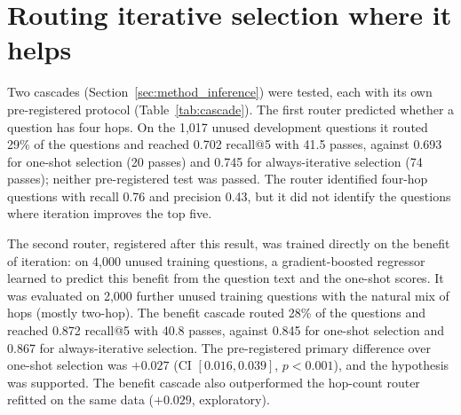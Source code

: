 \section{Routing iterative selection where it helps}
\label{sec:res_cascade}

Two cascades (Section~\ref{sec:method_inference}) were tested, each with its own pre-registered protocol (Table~\ref{tab:cascade}). The first router predicted whether a question has four hops. On the 1,017 unused development questions it routed 29\% of the questions and reached 0.702 recall@5 with 41.5 passes, against 0.693 for one-shot selection (20 passes) and 0.745 for always-iterative selection (74 passes); neither pre-registered test was passed. The router identified four-hop questions with recall 0.76 and precision 0.43, but it did not identify the questions where iteration improves the top five.

The second router, registered after this result, was trained directly on the benefit of iteration: on 4,000 unused training questions, a gradient-boosted regressor learned to predict this benefit from the question text and the one-shot scores. It was evaluated on 2,000 further unused training questions with the natural mix of hops (mostly two-hop). The benefit cascade routed 28\% of the questions and reached 0.872 recall@5 with 40.8 passes, against 0.845 for one-shot selection and 0.867 for always-iterative selection. The pre-registered primary difference over one-shot selection was $+0.027$ (CI $[0.016, 0.039]$, $p<0.001$), and the hypothesis was supported. The benefit cascade also outperformed the hop-count router refitted on the same data ($+0.029$, exploratory).

